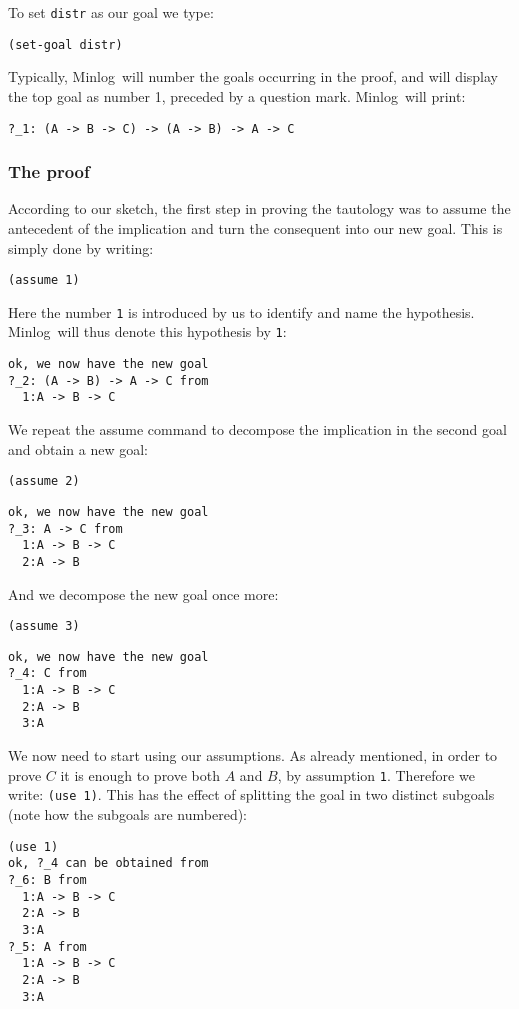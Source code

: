 \documentclass[12pt]{amsart}
\newcommand{\mi}{Minlog}
\begin{document}
To set \texttt{distr} as our goal we type:
\begin{verbatim}
(set-goal distr)
\end{verbatim}
Typically, \mi\ will number the goals occurring in the proof, and will
display the top goal as number 1, preceded by a question mark.  \mi\
will print:
\begin{verbatim}
?_1: (A -> B -> C) -> (A -> B) -> A -> C
\end{verbatim}


\subsubsection{The proof}
According to our sketch, the first step in proving the tautology was
to assume the antecedent of the implication and turn the consequent
into our new goal.  This is simply done by writing:
\begin{verbatim}
(assume 1)
\end{verbatim}

Here the number \texttt{1} is introduced by us to identify and name
the hypothesis. \mi\ will thus denote this hypothesis by \texttt{1}:
\begin{verbatim}
ok, we now have the new goal
?_2: (A -> B) -> A -> C from
  1:A -> B -> C
\end{verbatim}

We repeat the assume command to decompose the implication in the
second goal and obtain a new goal:
\begin{verbatim}
(assume 2)
\end{verbatim}

\begin{verbatim}
ok, we now have the new goal
?_3: A -> C from
  1:A -> B -> C
  2:A -> B
\end{verbatim}

And we decompose the new goal once more:
\begin{verbatim}
(assume 3)
\end{verbatim}

\begin{verbatim}
ok, we now have the new goal
?_4: C from
  1:A -> B -> C
  2:A -> B
  3:A
\end{verbatim}

We now need to start using our assumptions.  As already mentioned, in
order to prove $C$ it is enough to prove both $A$ and $B$, by
assumption \texttt{1}.  Therefore we write: \texttt{(use 1)}.
This has the effect of splitting the goal in two distinct subgoals
(note how the subgoals are numbered):
\begin{verbatim}
(use 1)
ok, ?_4 can be obtained from
?_6: B from
  1:A -> B -> C
  2:A -> B
  3:A
?_5: A from
  1:A -> B -> C
  2:A -> B
  3:A
\end{verbatim}
\end{document}
